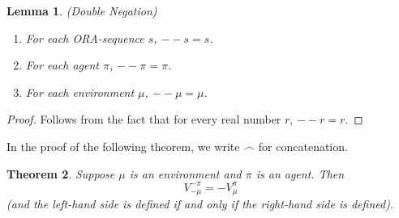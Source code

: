 \documentclass{article}
\newtheorem{theorem}{Theorem}
\newtheorem{lemma}[theorem]{Lemma}
\begin{document}
\begin{lemma}
\label{doublesubtractionlemma}
(Double Negation)
    \begin{enumerate}
        \item For each ORA-sequence $s$, $--s=s$.
        \item For each agent $\pi$, $--\pi=\pi$.
        \item For each environment $\mu$, $--\mu=\mu$.
    \end{enumerate}
\end{lemma}

\begin{proof}
    Follows from the fact that for every real number $r$, $--r=r$.
\end{proof}

In the proof of the following theorem, we write $\frown$ for concatenation.

\begin{theorem}
\label{bigtheorem}
    Suppose $\mu$ is an environment and $\pi$ is an agent.
    Then
    \[
        V^{-\pi}_{-\mu}=-V^\pi_\mu
    \]
    (and the left-hand side is defined if and only if the right-hand side is defined).
\end{theorem}
\end{document}
